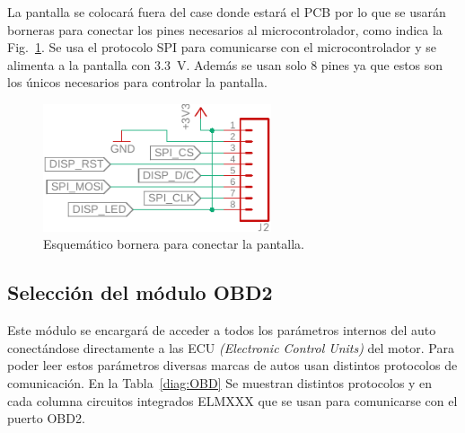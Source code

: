 La pantalla se colocará fuera del case donde estará el PCB por lo que se usarán borneras para conectar los pines necesarios al microcontrolador, como indica la Fig.~\ref{fig:DISPLAY_esquem}. Se usa el protocolo SPI para comunicarse con el microcontrolador y se alimenta a la pantalla con \SI{3.3}{V}. Además se usan solo 8 pines ya que estos son los únicos necesarios para controlar la pantalla.

\begin{figure}[htbp!]
\centering
\includegraphics[width=0.6\textwidth]{DISPLAY_esquem.pdf}
\caption{Esquemático bornera para conectar la pantalla.}
\label{fig:DISPLAY_esquem}
\end{figure}

\subsection{Selección del módulo OBD2}
Este módulo se encargará de acceder a todos los parámetros internos del auto conectándose directamente a las ECU \textit{(Electronic Control Units)} del motor. Para poder leer estos parámetros diversas marcas de autos usan distintos protocolos de comunicación. En la Tabla~\ref{diag:OBD} Se muestran distintos protocolos y en cada columna circuitos integrados ELMXXX que se usan para comunicarse con el puerto OBD2.

